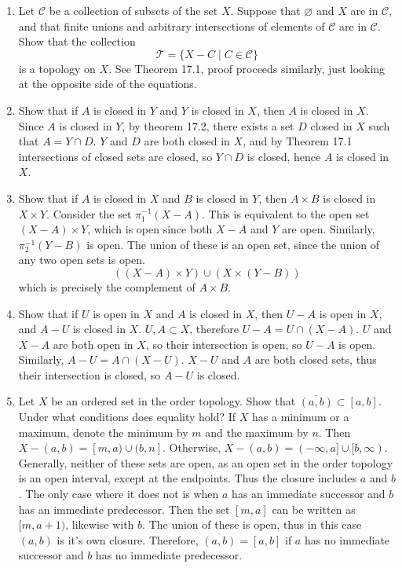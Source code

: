 \documentclass[12pt,letterpaper]{article}
\newcommand{\n}{\break}
\let\emptyset\varnothing
\newcommand{\T}{\ensuremath{\mathcal{T}}}
\begin{document}
\RaggedRight
\begin{enumerate}
  \item Let $\mathcal{C}$ be a collection of subsets of the set $X$. Suppose that $\emptyset$ and $X$ are in $\mathcal{C}$, and that finite unions and arbitrary intersections of elements of $\mathcal{C}$ are in $\mathcal{C}$. Show that the collection $$\T = \{X-C\; |\; C\in\mathcal{C}\}$$ is a topology on $X$.\n
  \indent See Theorem 17.1, proof proceeds similarly, just looking at the opposite side of the equations.
  \item Show that if $A$ is closed in $Y$ and $Y$ is closed in $X$, then $A$ is closed in $X$.\n
  \indent Since $A$ is closed in $Y$, by theorem 17.2, there exists a set $D$ closed in $X$ such that $A=Y\cap D$.
  $Y$ and $D$ are both closed in $X$, and by Theorem 17.1 intersections of closed sets are closed, so $Y\cap D$ is closed, hence $A$ is closed in $X$.
  \item Show that if $A$ is closed in $X$ and $B$ is closed in $Y$, then $A\times B$ is closed in $X\times Y$.\n
  \indent Consider the set $\pi_1^{-1}(X-A)$. This is equivalent to the open set $(X-A)\times Y$, which is open since both $X-A$ and $Y$ are open. Similarly, $\pi_2^{-1}(Y-B)$ is open. The union of these is an open set, since the union of any two open sets is open.
  $$((X-A)\times Y)\cup (X\times (Y-B))$$
  which is precisely the complement of $A\times B$.
  \item Show that if $U$ is open in $X$ and $A$ is closed in $X$, then $U-A$ is open in $X$, and $A-U$ is closed in $X$.\n
  \indent $U,A\subset X$, therefore $U-A = U\cap(X-A)$. $U$ and $X-A$ are both open in $X$, so their intersection is open, so $U-A$ is open.\hspace{5in}\n
  Similarly, $A-U=A\cap (X-U)$. $X-U$ and $A$ are both closed sets, thus their intersection is closed, so $A-U$ is closed. \hspace{5in}
  \item Let $X$ be an ordered set in the order topology. Show that $\overline{(a,b)} \subset [a,b]$. Under what conditions does equality hold? \n
  \indent If $X$ has a minimum or a maximum, denote the minimum by $m$ and the maximum by $n$. Then $X-(a,b) = [m,a) \cup (b, n]$. Otherwise, $X-(a,b)=(-\infty,a]\cup[b,\infty)$. Generally, neither of these sets are open, as an open set in the order topology is an open interval, except at the endpoints. Thus the closure includes $a$ and $b$. The only case where it does not is when $a$ has an immediate successor and $b$ has an immediate predecessor. Then the set $[m,a]$ can be written as $[m,a+1)$, likewise with $b$. The union of these is open, thus in this case $(a,b)$ is it's own closure. Therefore, $\overline{(a,b)}=[a,b]$ if $a$ has no immediate successor and $b$ has no immediate predecessor.\n

\end{enumerate}
\end{document}
